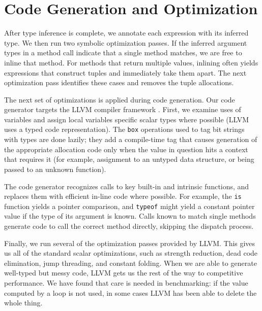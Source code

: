 \section{Code Generation and Optimization}

After type inference is complete, we annotate each expression with its
inferred type. We then run two symbolic optimization passes.
If the inferred argument types in a method call
indicate that a single method matches, we are free to inline that method.
For methods that return multiple values, inlining often yields
expressions that construct tuples and immediately take them apart. The
next optimization pass identifies these cases and removes the tuple
allocations.

The next set of optimizations is applied during code generation.
Our code generator targets the LLVM compiler framework \cite{LLVM}.
First, we examine uses of variables and assign local variables specific
scalar types where possible (LLVM uses a typed code representation).
The {\tt box} operations used to tag bit strings with types are done
lazily; they add a compile-time tag that causes generation of the
appropriate allocation code only when the value in question hits a context
that requires it (for example, assignment to an untyped data structure,
or being passed to an unknown function).

The code generator recognizes calls to key built-in and intrinsic functions,
and replaces them with efficient in-line code where possible. For example,
the {\tt is} function yields a pointer comparison, and {\tt typeof} might
yield a constant pointer value if the type of its argument is known.
Calls known to match single methods generate code to call the correct
method directly, skipping the dispatch process.

Finally, we run several of the optimization passes provided by LLVM.
This gives us all of the standard scalar optimizations, such as
strength reduction, dead code elimination, jump threading, and constant
folding. When
we are able to generate well-typed but messy code, LLVM gets us the
rest of the way to competitive performance. We have found that care
is needed in benchmarking: if the value computed by a loop is not
used, in some cases LLVM has been able to delete the whole thing.



% 
